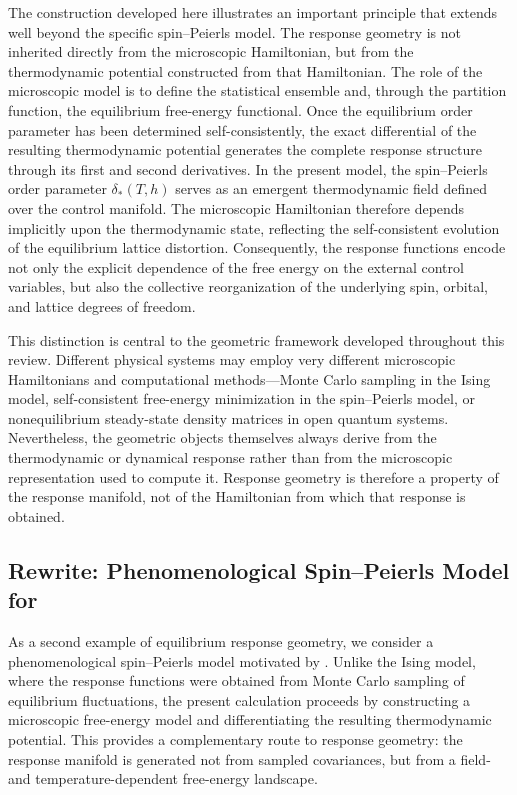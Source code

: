The construction developed here illustrates an important
principle that extends well beyond the specific spin--Peierls
model. The response geometry is not inherited directly from the
microscopic Hamiltonian, but from the thermodynamic potential
constructed from that Hamiltonian. The role of the microscopic
model is to define the statistical ensemble and, through the
partition function, the equilibrium free-energy functional.
Once the equilibrium order parameter has been determined
self-consistently, the exact differential of the resulting
thermodynamic potential generates the complete response
structure through its first and second derivatives.
In the present model, the spin--Peierls order parameter
\(\delta_\ast(T,h)\) serves as an emergent thermodynamic field
defined over the control manifold. The microscopic Hamiltonian
therefore depends implicitly upon the thermodynamic state,
reflecting the self-consistent evolution of the equilibrium
lattice distortion. Consequently, the response functions encode
not only the explicit dependence of the free energy on the
external control variables, but also the collective
reorganization of the underlying spin, orbital, and lattice
degrees of freedom.

This distinction is central to the geometric framework developed
throughout this review. Different physical systems may employ
very different microscopic Hamiltonians and computational
methods---Monte Carlo sampling in the Ising model,
self-consistent free-energy minimization in the spin--Peierls
model, or nonequilibrium steady-state density matrices in open
quantum systems. Nevertheless, the geometric objects themselves
always derive from the thermodynamic or dynamical response
rather than from the microscopic representation used to compute
it. Response geometry is therefore a property of the response
manifold, not of the Hamiltonian from which that response is
obtained.


\subsection{Rewrite: Phenomenological Spin--Peierls Model for }
As a second example of equilibrium response geometry, we consider
a phenomenological spin--Peierls model motivated by .
Unlike the Ising model, where the response functions were obtained
from Monte Carlo sampling of equilibrium fluctuations, the present
calculation proceeds by constructing a microscopic free-energy model
and differentiating the resulting thermodynamic potential. This
provides a complementary route to response geometry: the response
manifold is generated not from sampled covariances, but from a
field- and temperature-dependent free-energy landscape.

